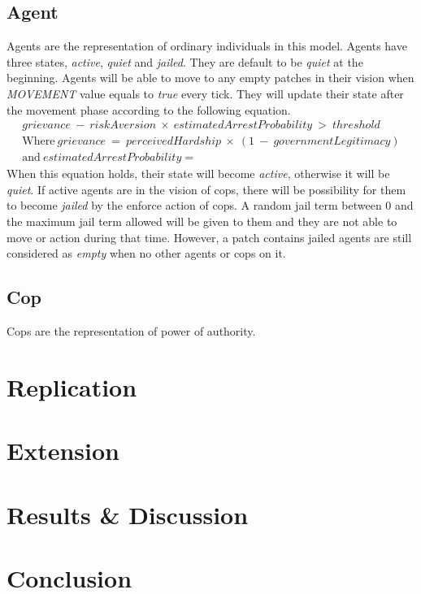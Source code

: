 \documentclass[11pt]{article}
\begin{document}
        \subsection{Agent}
        Agents are the representation of ordinary individuals in this model. Agents
        have three states, \textit{active}, \textit{quiet} and \textit{jailed}. 
        They are default to be \textit{quiet} at the beginning. Agents will be able
        to move to any empty patches in their vision when \textit{MOVEMENT} value
        equals to \textit{true} every tick. They will update their state after the
        movement phase according to the following equation.
        \begin{equation}
            \begin{split}
                grievance\:-\:riskAversion\:\times\:estimatedArrestProbability\:>\:threshold \\
                \text{Where}\ grievance\:=\:perceivedHardship\:\times\:(1\:-\:governmentLegitimacy)\\
                \text{and}\ estimatedArrestProbability = 
            \end{split}
        \end{equation}  
        When this equation holds, their state will become \textit{active}, otherwise
        it will be \textit{quiet}. If active agents are in the vision of cops, there
        will be possibility for them to become \textit{jailed} by the enforce action
        of cops. A random jail term between 0 and the maximum jail term allowed will
        be given to them and they are not able to move or action during that time.
        However, a patch contains jailed agents are still considered as \textit{empty}
        when no other agents or cops on it.
        \subsection{Cop}
        Cops are the representation of power of authority.
        
    \section{Replication}
    \section{Extension}
    \section{Results \& Discussion}
    \section{Conclusion}
\end{document}
